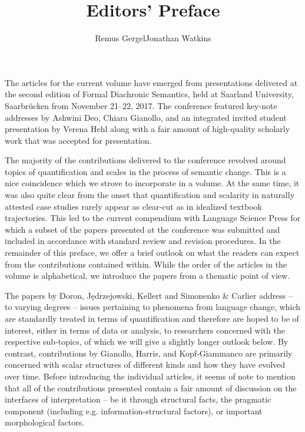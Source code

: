 \documentclass[output=paper]{langsci/langscibook}
\title{Editors' Preface}
\author{Remus Gergel\affiliation{Universität des Saarlandes}\lastand Jonathan Watkins\affiliation{Universität des Saarlandes}}
\begin{document}
\maketitle

The articles for the current volume have emerged from presentations delivered at the second edition of Formal Diachronic Semantics, held at Saarland University, Saarbrücken from November 21--22, 2017. The conference featured key-note addresses by Ashwini Deo, Chiara Gianollo, and an integrated invited student presentation by Verena Hehl along with a fair amount of high-quality scholarly work that was accepted for presentation.

The majority of the contributions delivered to the conference revolved around topics of quantification and scales in the process of semantic change. This is a nice coincidence which we strove to incorporate in a volume. At the same time, it was also quite clear from the onset that quantification and scalarity in naturally attested case studies rarely appear as clear-cut as in idealized textbook trajectories. This led to the current compendium with Language Science Press for which a subset of the papers presented at the conference was submitted and included in accordance with standard review and revision procedures. In the remainder of this preface, we offer a brief outlook on what the readers can expect from the contributions contained within. While the order of the articles in the volume is alphabetical, we introduce the papers from a thematic point of view.

The papers by Doron, Jędrzejowski, Kellert and Simonenko \& Carlier address – to varying degrees – issues pertaining to phenomena from language change, which are standardly treated in terms of quantification and therefore are hoped to be of interest, either in terms of data or analysis, to researchers concerned with the respective sub-topics, of which we will give a slightly longer outlook below. By contrast, contributions by Gianollo, Harris, and Kopf-Giammanco are primarily concerned with scalar structures of different kinds and how they have evolved over time. Before introducing the individual articles, it seems of note to mention that all of the contributions presented contain a fair amount of discussion on the interfaces of interpretation – be it through structural facts, the pragmatic component (including e.g. information-structural factors), or important morphological factors. 
\end{document}
